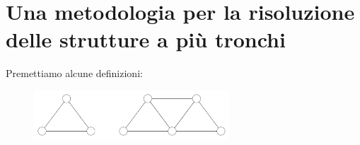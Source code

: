 \section{Una metodologia per la risoluzione delle strutture a più tronchi}
Premettiamo alcune definizioni:
\renewcommand{\thefigure}{8~-~1}
\begin{figure}[ht]
\centering
\includegraphics[width=0.65\textwidth]{Immagini/Parte_8/Figura8_1/Figura8_1.pdf}
\caption{}
\label{figura8-1}
\end{figure}
